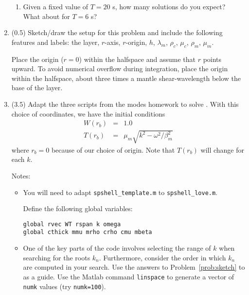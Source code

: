 \documentclass[11pt,titlepage,fleqn]{article}
\begin{document}
\begin{enumerate}
\begin{enumerate}
\item Given a fixed value of $T = 20$ s, how many solutions do you expect? \\
What about for $T = 6$ s? 
\end{enumerate}

\label{prob:sketch}



\item (0.5) Sketch/draw the setup for this problem and include the following features and labels: the layer, $r$-axis, $r$-origin, $h$, $\lambda_m$, $\rho_c$, $\mu_c$, $\rho_m$, $\mu_m$.

Place the origin ($r = 0$) within the halfspace and assume that $r$ points upward. To avoid numerical overflow during integration, place the origin within the halfspace, about three times a mantle shear-wavelength below the base of the layer.


\pagebreak
\item (3.5) Adapt the three scripts from the modes homework to solve . With this choice of coordinates, we have the initial conditions
%
\begin{eqnarray}
W(r_b) &=& 1.0
\\
T(r_b) &=& \mu_m \sqrt{k^2 - \omega^2/\beta_m^2}
\end{eqnarray}
%
where $r_b = 0$ because of our choice of origin. Note that $T(r_b)$ will change for each $k$.
%
%

Notes:
%
\begin{itemize}
\item You will need to adapt \verb+spshell_template.m+ to \verb+spshell_love.m+.

Define the following global variables:
%
\begin{verbatim}
global rvec WT rspan k omega
global cthick mmu mrho crho cmu mbeta
\end{verbatim}

\item One of the key parts of the code involves selecting the range of $k$ when searching for the roots $k_n$. Furthermore, consider the order in which $k_n$ are computed in your search. Use the answers to Problem~\ref{prob:sketch} to as a guide. Use the Matlab command \verb+linspace+ to generate a vector of \verb+numk+ values (try \verb+numk=100+).


\end{itemize}
\end{enumerate}
\end{document}
